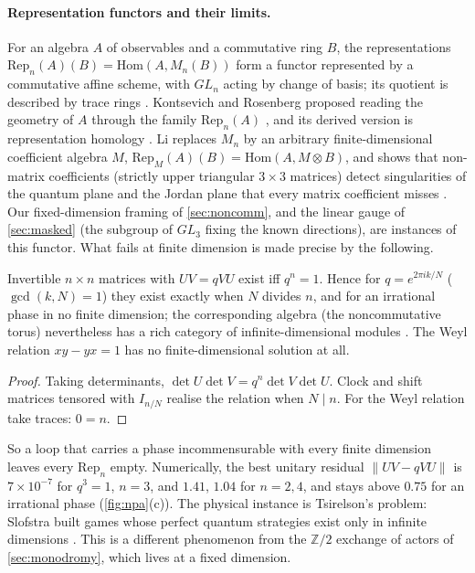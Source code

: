 \documentclass[11pt]{article}
\theoremstyle{definition}\newtheorem{definition}[theorem]{Definition}\newtheorem{remark}[theorem]{Remark}\newtheorem{example}[theorem]{Example}
\begin{document}
\paragraph{Representation functors and their limits.}
For an algebra $A$ of observables and a commutative ring $B$, the representations $\mathrm{Rep}_n(A)(B)=\mathrm{Hom}(A,M_n(B))$ form a functor
represented by a commutative affine scheme, with $GL_n$ acting by change of basis; its quotient is described by trace rings
\cite{Procesi1976}. Kontsevich and Rosenberg proposed reading the geometry of $A$ through the family $\mathrm{Rep}_n(A)$ \cite{KontsevichRosenberg2000},
and its derived version is representation homology \cite{BerestFelderRamadoss2014}. Li replaces $M_n$ by an arbitrary finite-dimensional
coefficient algebra $M$, $\mathrm{Rep}_M(A)(B)=\mathrm{Hom}(A,M\otimes B)$, and shows that non-matrix coefficients (strictly upper triangular
$3\times3$ matrices) detect singularities of the quantum plane and the Jordan plane that every matrix coefficient misses \cite{Li2026}. Our
fixed-dimension framing of \cref{sec:noncomm}, and the linear gauge of \cref{sec:masked} (the subgroup of $GL_3$ fixing the known
directions), are instances of this functor. What fails at finite dimension is made precise by the following.

\begin{proposition}\label{prop:holdim}
Invertible $n\times n$ matrices with $UV=qVU$ exist iff $q^n=1$. Hence for $q=e^{2\pi ik/N}$ ($\gcd(k,N)=1$) they exist exactly when $N$
divides $n$, and for an irrational phase in no finite dimension; the corresponding algebra (the noncommutative torus) nevertheless has a rich
category of infinite-dimensional modules \cite{Rieffel1981,Connes1994}. The Weyl relation $xy-yx=1$ has no finite-dimensional solution at all.
\end{proposition}

\begin{proof}
Taking determinants, $\det U\det V=q^n\det V\det U$. Clock and shift matrices tensored with $I_{n/N}$ realise the relation when $N\mid n$.
For the Weyl relation take traces: $0=n$.
\end{proof}

So a loop that carries a phase incommensurable with every finite dimension leaves every $\mathrm{Rep}_n$ empty. Numerically, the best unitary
residual $\|UV-qVU\|$ is $7\times10^{-7}$ for $q^3=1$, $n=3$, and $1.41$, $1.04$ for $n=2,4$, and stays above $0.75$ for an irrational phase
(\cref{fig:npa}(c)). The physical instance is Tsirelson's problem: Slofstra built games whose perfect quantum strategies exist only in
infinite dimensions \cite{Slofstra2020}. This is a different phenomenon from the $\mathbb Z/2$ exchange of actors of \cref{sec:monodromy},
which lives at a fixed dimension.
\end{document}
